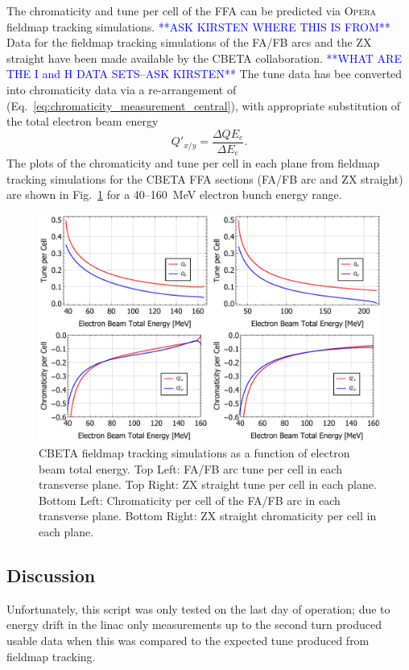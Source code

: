 \documentclass[../main.tex]{subfiles}
\begin{document}
The chromaticity and tune per cell of the FFA can be predicted via \textsc{Opera} fieldmap tracking simulations. \textcolor{blue}{**ASK KIRSTEN WHERE THIS IS FROM**} Data for the fieldmap tracking simulations of the FA/FB arcs and the ZX straight have been made available by the CBETA collaboration. \textcolor{blue}{**WHAT ARE THE I and H DATA SETS--ASK KIRSTEN**} The tune data has bee converted into chromaticity data via a re-arrangement of (Eq.~\ref{eq:chromaticity_measurement_central}), with appropriate substitution of the total electron beam energy
\begin{equation}
Q'_{x/y} = \frac{\Delta Q E_{e}}{\Delta E_{e}}.
\label{eq:fieldmap_chromaticity}
\end{equation}
The plots of the chromaticity and tune per cell in each plane from fieldmap tracking simulations for the CBETA FFA sections (FA/FB arc and ZX straight) are shown in Fig.~\ref{fig:fieldmap_chromaticity_tune} for a 40--160~\si{\mega\electronvolt} electron bunch energy range.
\begin{figure}[!h]
\centering
\includegraphics[width=\textwidth]{Figures/CBETA_Multi-Pass_Commissioning/fieldmap_grid.pdf}
\caption{CBETA fieldmap tracking simulations as a function of electron beam total energy. Top Left: FA/FB arc tune per cell in each transverse plane. Top Right: ZX straight tune per cell in each plane. Bottom Left: Chromaticity per cell of the FA/FB arc in each transverse plane. Bottom Right: ZX straight chromaticity per cell in each plane. }
\label{fig:fieldmap_chromaticity_tune}
\end{figure}

\subsection{Discussion}
\label{sec:chromaticity_discussion}

Unfortunately, this script was only tested on the last day of operation; due to energy drift in the linac only measurements
up to the second turn produced usable data when this was compared to the expected tune produced from fieldmap tracking.
\end{document}
